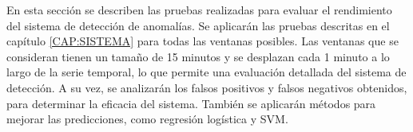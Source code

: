 En esta sección se describen las pruebas realizadas para evaluar el rendimiento del sistema de detección de anomalías. Se aplicarán las pruebas descritas en el capítulo \ref{CAP:SISTEMA} para todas las ventanas posibles. Las ventanas que se consideran tienen un tamaño de 15 minutos y se desplazan cada 1 minuto a lo largo de la serie temporal, lo que permite una evaluación detallada del sistema de detección. A su vez, se analizarán los falsos positivos y falsos negativos obtenidos, para determinar la eficacia del sistema.
También se aplicarán métodos para mejorar las predicciones, como regresión logística y \ac{SVM}.
